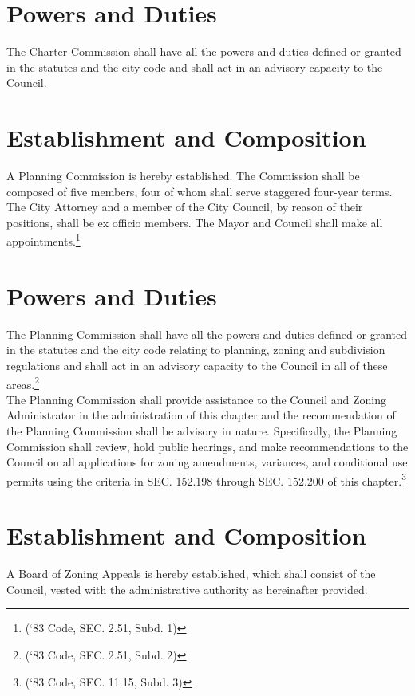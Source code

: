 \section{Powers and Duties}
The Charter Commission shall have all the powers and duties defined or granted in the statutes and the city code and shall act in an advisory capacity to the Council.\\

\setcounter{section}{119}
\section{Establishment and Composition}
A Planning Commission is hereby established.  The Commission shall be composed of five members, four of whom shall serve staggered four-year terms.  The City Attorney and a member of the City Council, by reason of their positions, shall be ex officio members.  The Mayor and Council shall make all appointments.\footnote{(‘83 Code, SEC. 2.51, Subd. 1)}

\section{Powers and Duties}
The Planning Commission shall have all the powers and duties defined or granted in the statutes and the city code relating to planning, zoning and subdivision regulations and shall act in an advisory capacity to the Council in all of these areas.\footnote{(‘83 Code, SEC. 2.51, Subd. 2)}\\
The Planning Commission shall provide assistance to the Council and Zoning Administrator in the administration of this chapter and the recommendation of the Planning Commission shall be advisory in nature. Specifically, the Planning Commission shall review, hold public hearings, and make recommendations to the Council on all applications for zoning amendments, variances, and conditional use permits using the criteria in SEC. 152.198 through SEC. 152.200 of this chapter.\footnote{(‘83 Code, SEC. 11.15, Subd. 3)}

\setcounter{section}{129}
\section{Establishment and Composition}
A Board of Zoning Appeals is hereby established, which shall consist of the Council, vested with the administrative authority as hereinafter provided.


